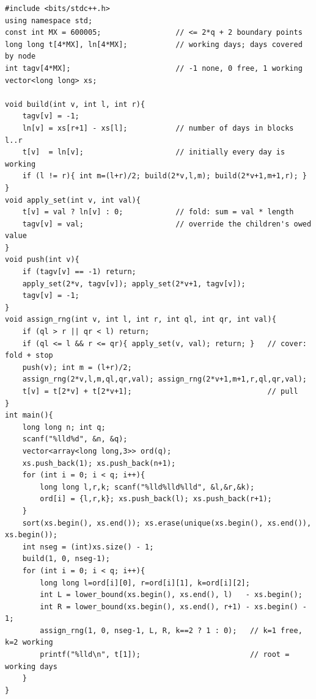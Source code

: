 \begin{lstlisting}[caption={CF 915E full solution: compressed lazy assign tree; the answer is the root sum}, label={lst:c15-915-soln}]
#include <bits/stdc++.h>
using namespace std;
const int MX = 600005;                 // <= 2*q + 2 boundary points
long long t[4*MX], ln[4*MX];           // working days; days covered by node
int tagv[4*MX];                        // -1 none, 0 free, 1 working
vector<long long> xs;

void build(int v, int l, int r){
    tagv[v] = -1;
    ln[v] = xs[r+1] - xs[l];           // number of days in blocks l..r
    t[v]  = ln[v];                     // initially every day is working
    if (l != r){ int m=(l+r)/2; build(2*v,l,m); build(2*v+1,m+1,r); }
}
void apply_set(int v, int val){
    t[v] = val ? ln[v] : 0;            // fold: sum = val * length
    tagv[v] = val;                     // override the children's owed value
}
void push(int v){
    if (tagv[v] == -1) return;
    apply_set(2*v, tagv[v]); apply_set(2*v+1, tagv[v]);
    tagv[v] = -1;
}
void assign_rng(int v, int l, int r, int ql, int qr, int val){
    if (ql > r || qr < l) return;
    if (ql <= l && r <= qr){ apply_set(v, val); return; }   // cover: fold + stop
    push(v); int m = (l+r)/2;
    assign_rng(2*v,l,m,ql,qr,val); assign_rng(2*v+1,m+1,r,ql,qr,val);
    t[v] = t[2*v] + t[2*v+1];                               // pull
}
int main(){
    long long n; int q;
    scanf("%lld%d", &n, &q);
    vector<array<long long,3>> ord(q);
    xs.push_back(1); xs.push_back(n+1);
    for (int i = 0; i < q; i++){
        long long l,r,k; scanf("%lld%lld%lld", &l,&r,&k);
        ord[i] = {l,r,k}; xs.push_back(l); xs.push_back(r+1);
    }
    sort(xs.begin(), xs.end()); xs.erase(unique(xs.begin(), xs.end()), xs.begin());
    int nseg = (int)xs.size() - 1;
    build(1, 0, nseg-1);
    for (int i = 0; i < q; i++){
        long long l=ord[i][0], r=ord[i][1], k=ord[i][2];
        int L = lower_bound(xs.begin(), xs.end(), l)   - xs.begin();
        int R = lower_bound(xs.begin(), xs.end(), r+1) - xs.begin() - 1;
        assign_rng(1, 0, nseg-1, L, R, k==2 ? 1 : 0);   // k=1 free, k=2 working
        printf("%lld\n", t[1]);                         // root = working days
    }
}
\end{lstlisting}

